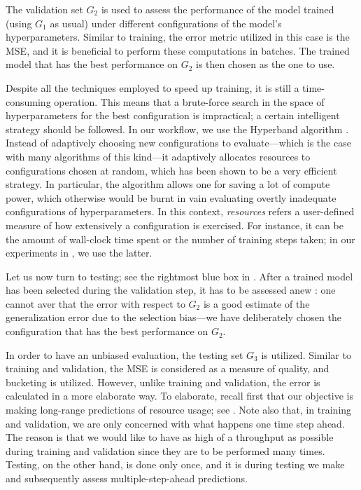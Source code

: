 The validation set $G_2$ is used to assess the performance of the model trained
(using $G_1$ as usual) under different configurations of the model's
hyperparameters. Similar to training, the error metric utilized in this case is
the \ac{MSE}, and it is beneficial to perform these computations in batches. The
trained model that has the best performance on $G_2$ is then chosen as the one
to use.

Despite all the techniques employed to speed up training, it is still a
time-consuming operation. This means that a brute-force search in the space of
hyperparameters for the best configuration is impractical; a certain intelligent
strategy should be followed. In our workflow, we use the Hyperband algorithm
\cite{li2016}. Instead of adaptively choosing new configurations to
evaluate---which is the case with many algorithms of this kind---it adaptively
allocates resources to configurations chosen at random, which has been shown to
be a very efficient strategy. In particular, the algorithm allows one for saving
a lot of compute power, which otherwise would be burnt in vain evaluating
overtly inadequate configurations of hyperparameters. In this context,
\emph{resources} refers a user-defined measure of how extensively a
configuration is exercised. For instance, it can be the amount of wall-clock
time spent or the number of training steps taken; in our experiments in
, we use the latter.

Let us now turn to testing; see the rightmost blue box in .
After a trained model has been selected during the validation step, it has to be
assessed anew \cite{hastie2013}: one cannot aver that the error with respect to
$G_2$ is a good estimate of the generalization error due to the selection
bias---we have deliberately chosen the configuration that has the best
performance on $G_2$.

In order to have an unbiased evaluation, the testing set $G_3$ is utilized.
Similar to training and validation, the \ac{MSE} is considered as a measure of
quality, and bucketing is utilized. However, unlike training and validation, the
error is calculated in a more elaborate way. To elaborate, recall first that our
objective is making long-range predictions of resource usage; see
. Note also that, in training and validation, we are only
concerned with what happens one time step ahead. The reason is that we would
like to have as high of a throughput as possible during training and validation
since they are to be performed many times. Testing, on the other hand, is done
only once, and it is during testing we make and subsequently assess
multiple-step-ahead predictions.


